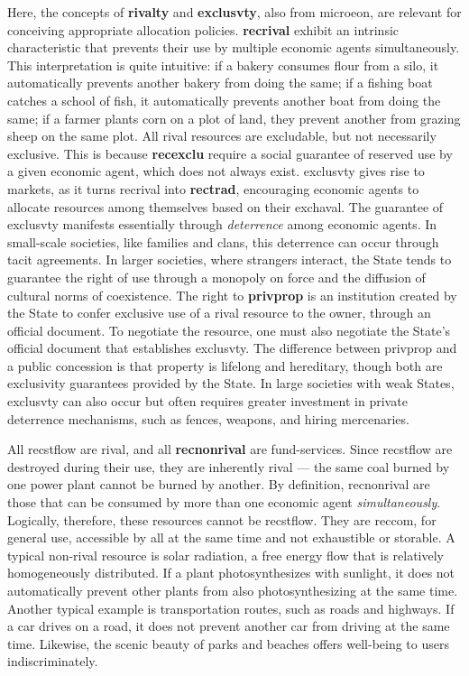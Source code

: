 \documentclass[./main_en.tex]{subfiles}
\begin{document}
\par Here, the concepts of \textbf{\gls{rivalty}} and \textbf{\gls{exclusvty}}, also from \gls{microeon}, are relevant for conceiving appropriate allocation policies. \textbf{\gls{recrival}} exhibit an intrinsic characteristic that prevents their use by multiple economic agents simultaneously. This interpretation is quite intuitive: if a bakery consumes flour from a silo, it automatically prevents another bakery from doing the same; if a fishing boat catches a school of fish, it automatically prevents another boat from doing the same; if a farmer plants corn on a plot of land, they prevent another from grazing sheep on the same plot. All rival resources are excludable, but not necessarily exclusive. This is because \textbf{\gls{recexclu}} require a social guarantee of reserved use by a given economic agent, which does not always exist. \gls{exclusvty} gives rise to markets, as it turns \gls{recrival} into \textbf{\gls{rectrad}}, encouraging economic agents to allocate resources among themselves based on their \gls{exchaval}. The guarantee of \gls{exclusvty} manifests essentially through \textit{deterrence} among economic agents. In small-scale societies, like families and clans, this deterrence can occur through tacit agreements. In larger societies, where strangers interact, the State tends to guarantee the right of use through a monopoly on force and the diffusion of cultural norms of coexistence. The right to \textbf{\gls{privprop}} is an institution created by the State to confer exclusive use of a rival resource to the owner, through an official document. To negotiate the resource, one must also negotiate the State’s official document that establishes \gls{exclusvty}. The difference between \gls{privprop} and a public concession is that property is lifelong and hereditary, though both are exclusivity guarantees provided by the State. In large societies with weak States, \gls{exclusvty} can also occur but often requires greater investment in private deterrence mechanisms, such as fences, weapons, and hiring mercenaries.

\par All \gls{recstflow} are rival, and all \textbf{\gls{recnonrival}} are fund-services. Since \gls{recstflow} are destroyed during their use, they are inherently rival — the same coal burned by one power plant cannot be burned by another. By definition, \gls{recnonrival} are those that can be consumed by more than one economic agent \textit{simultaneously}. Logically, therefore, these resources cannot be \gls{recstflow}. They are \gls{reccom}, for general use, accessible by all at the same time and not exhaustible or storable. A typical non-rival resource is solar radiation, a free energy flow that is relatively homogeneously distributed. If a plant photosynthesizes with sunlight, it does not automatically prevent other plants from also photosynthesizing at the same time. Another typical example is transportation routes, such as roads and highways. If a car drives on a road, it does not prevent another car from driving at the same time. Likewise, the scenic beauty of parks and beaches offers well-being to users indiscriminately.
\end{document}
